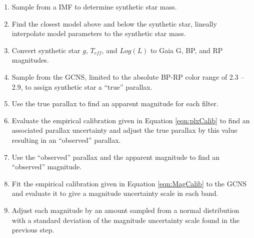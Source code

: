 %
%
\begin{enumerate}
	\item Sample from a \citet{Sollima2019} IMF to determine synthetic star mass.
	\item Find the closest model above and below the synthetic star, lineally
		interpolate model parameters to the synthetic star mass.
	\item Convert synthetic star $g$, $T_{eff}$, and $Log(L)$ to Gaia G, BP,
		and RP magnitudes.
	\item Sample from the GCNS, limited to the absolute BP-RP color range of
		2.3 -- 2.9, to assign synthetic star a ``true'' parallax.
	\item Use the true parallax to find an apparent magnitude for each filter.
	\item Evaluate the empirical calibration given in Equation
		\ref{eqn:plxCalib} to find an associated parallax uncertainty and
		adjust the true parallax by this value resulting in an ``observed''
		parallax.
	\item Use the ``observed'' parallax and the apparent magnitude to find an
		``observed'' magnitude.
	\item Fit the empirical calibration given in Equation \ref{eqn:MagCalib} to
		the GCNS and evaluate it to give a magnitude uncertainty scale in each
		band.
	\item Adjust each magnitude by an amount sampled from a normal
		distribution with a standard deviation of the magnitude uncertainty
		scale found in the previous step.
\end{enumerate}

